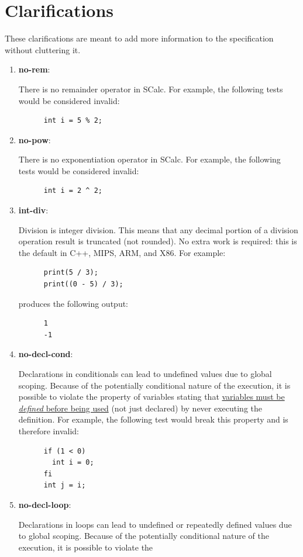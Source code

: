 \documentclass{article}
\newcommand{\clarificationdest}[1]{\hypertarget{#1}{\textbf{#1}:}}
\begin{document}
\section{Clarifications}
These clarifications are meant to add more information to the specification without cluttering it.
\begin{enumerate}
  \item
    \clarificationdest{no-rem}
    There is no remainder operator in SCalc. For example, the following tests would be considered
    invalid:
    \begin{lstlisting}
      int i = 5 % 2;
    \end{lstlisting}
  \item
    \clarificationdest{no-pow}
    There is no exponentiation operator in SCalc. For example, the following tests would be
    considered invalid:
    \begin{lstlisting}
      int i = 2 ^ 2;
    \end{lstlisting}
  \item
    \clarificationdest{int-div}
    Division is integer division. This means that any decimal portion of a division operation
    result is truncated (not rounded). No extra work is required: this is the default in C++, MIPS,
    ARM, and X86. For example:
    \begin{lstlisting}
      print(5 / 3);
      print((0 - 5) / 3);
    \end{lstlisting}
    produces the following output:
    \begin{lstlisting}
      1
      -1
    \end{lstlisting}
  \item
    \clarificationdest{no-decl-cond}
    Declarations in conditionals can lead to undefined values due to global scoping.  Because of
    the potentially conditional nature of the execution, it is possible to violate the property of
    variables stating that \hyperlink{variable-props}{variables must be \textit{defined} before
    being used} (not just declared) by never executing the definition. For example, the following
    test would break this property and is therefore invalid:
    \begin{lstlisting}
      if (1 < 0)
        int i = 0;
      fi
      int j = i;
    \end{lstlisting}
  \item
    \clarificationdest{no-decl-loop}
    Declarations in loops can lead to undefined or repeatedly defined values due to global scoping.
    Because of the potentially conditional nature of the execution, it is possible to violate the

\end{enumerate}
\end{document}
